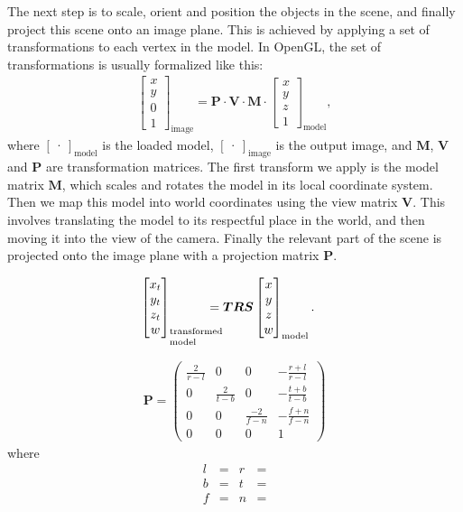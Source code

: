 \documentclass[12pt,journal,draftclsnofoot,onecolumn]{IEEEtran}
\newcommand\bmat[1]{\begin{bmatrix}#1\end{bmatrix}}
\renewcommand\vec[1]{\boldsymbol{#1}}
\newcommand\mat[1]{\boldsymbol{#1}}
\newcommand\1{\vec 1}
\newcommand*\y{\vec y}
\renewcommand*\P{\mat P}
\newcommand*\R{\mat R}
\renewcommand*\P{\mat P}
\newcommand*\V{\mat V}
\newcommand*\M{\mat M}
\begin{document}
The next step is to scale, orient and position the objects in the scene, and finally project this scene onto an image plane. This is achieved by applying a set of transformations to each vertex in the model. In OpenGL, the set of transformations is usually formalized like this:
\begin{align*}
\bmat{x\\y\\0\\1}_\text{image} = \P \cdot \V \cdot \M \cdot \bmat{x\\y\\z\\1}_\text{model},
\end{align*}
where $\bmat{\cdot}_\text{model}$ is the loaded model, $\bmat{\cdot}_\text{image}$ is the output image, and $\M$, $\V$ and $\P$ are transformation matrices. The first transform we apply is the model matrix $\M$, which scales and rotates the model in its local coordinate system. Then we map this model into world coordinates using the view matrix $\V$. This involves translating the model to its respectful place in the world, and then moving it into the view of the camera. Finally the relevant part of the scene is projected onto the image plane with a projection matrix $\P$. 


\begin{align}
\bmat{x_t \\ y_t \\ z_t \\ w}_\text{\parbox{1cm}{\setlength\baselineskip{0.3cm}transformed\\model}} &= \boldsymbol{T}\R\boldsymbol{S} \bmat{x \\ y \\ z \\ w}_\text{model}.
\end{align}

\begin{align}
\P = \left(\begin{matrix}
\frac{2}{r-l}  &  0              &  0              &  -\frac{r+l}{r-l} \\
0              &  \frac{2}{t-b}  &  0              &  -\frac{t+b}{t-b} \\
0              &  0              &  \frac{-2}{f-n} &  -\frac{f+n}{f-n} \\
0              &  0              &  0              &  1
\end{matrix}\right)
\end{align}
where
\begin{align*}
l &=   &  r &= \\
b &=   &  t &= \\
f &=   &  n &= 
\end{align*}
\end{document}
